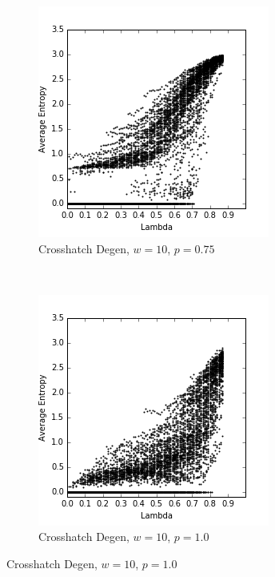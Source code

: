 \documentclass[a4paper,11pt,twoside]{report}
\begin{document}
\begin{figure}[htp]
\begin{subfigure}[t]{0.4\textwidth}
  \end{subfigure}

\begin{subfigure}[t]{0.4\textwidth}
  \centering
  \includegraphics[width=\textwidth]{ch6_figs/ch_w10_p75_entropy_scatter}
  \caption{Crosshatch Degen, $w=10$, $p=0.75$}
  \label{fig:lw_w10_p75}
  \end{subfigure}
~
\begin{subfigure}[t]{0.4\textwidth}
  \centering
  \includegraphics[width=\textwidth]{ch6_figs/ch_w10_p100_entropy_scatter}
  \caption{Crosshatch Degen, $w=10$, $p=1.0$}
  \label{fig:lw_w10_p100}
  \end{subfigure}


\end{figure}
\end{document}
